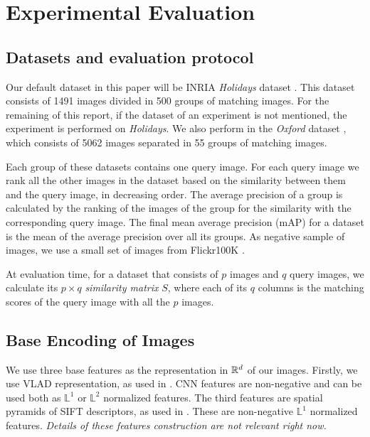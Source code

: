 \section{Experimental Evaluation}


\subsection{Datasets and evaluation protocol} \label{eval:protocol}
Our default dataset in this paper will be INRIA \emph{Holidays} dataset \cite{holidays}. This dataset consists of 1491 images divided in 500 groups of matching images. For the remaining of this report, if the dataset of an experiment is not mentioned, the experiment is performed on \emph{Holidays}.
We also perform in the \emph{Oxford} dataset \cite{oxford}, which consists of 5062 images separated in 55 groups of matching images.

Each group of these datasets contains one query image. For each query image we rank all the other images in the dataset based on the similarity between them and the query image, in decreasing order. The average precision of a group is calculated by the ranking of the images of the group for the similarity with the corresponding query image. The final mean average precision (mAP) for a dataset is the mean of the average precision over all its groups.
As negative sample of images, we use a small set of images from Flickr100K \cite{oxford}.

At evaluation time, for a dataset that consists of $p$ images and $q$ query images, we calculate its $p\times q$ \emph{similarity matrix} $S$, where each of its $q$ columns is the matching scores of the query image with all the $p$ images.
\subsection{Base Encoding of Images}
We use three base features as the representation in $\mathbb R^d$ of our images. Firstly, we use VLAD representation, as used in \cite{ZePe15}. 
CNN features are non-negative and can be used both as $\mathbb{L}^1$ or $\mathbb{L}^2$ normalized features. The third features are spatial pyramids of SIFT descriptors, as used in \cite{spk}. These are non-negative $\mathbb{L}^1$ normalized features. \emph{\color{red} Details of these features construction are not relevant right now.}
